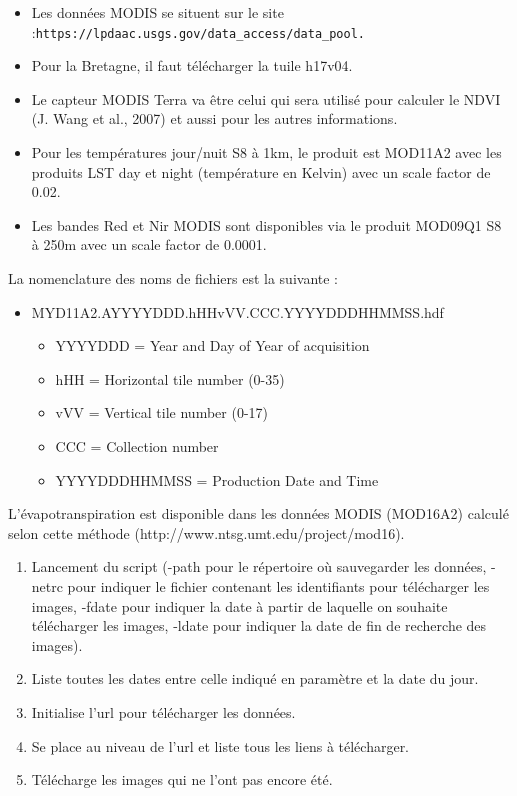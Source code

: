 \documentclass[10pt,a4paper]{article}
\begin{document}
\begin{itemize}
\item Les données MODIS se situent sur le site :\newline \verb!https://lpdaac.usgs.gov/data_access/data_pool.!
\item Pour la Bretagne, il faut télécharger la tuile h17v04. 
\item Le capteur MODIS Terra va être celui qui sera utilisé pour calculer le NDVI (J. Wang et al., 2007) et aussi pour les autres informations.
\item Pour les températures jour/nuit S8 à 1km, le produit est MOD11A2 avec les produits LST day et night (température en Kelvin) avec un scale factor de 0.02.
\item Les bandes Red et Nir MODIS sont disponibles via le produit MOD09Q1 S8 à 250m avec un scale factor de 0.0001.
\end{itemize}  

La nomenclature des noms de fichiers est la suivante :
\begin{itemize}
\item MYD11A2.AYYYYDDD.hHHvVV.CCC.YYYYDDDHHMMSS.hdf
\begin{itemize}
\item YYYYDDD = Year and Day of Year of acquisition
\item hHH = Horizontal tile number (0-35)
\item vVV = Vertical tile number (0-17)
\item CCC = Collection number
\item YYYYDDDHHMMSS = Production Date and Time
\end{itemize}
\end{itemize}

L'évapotranspiration est disponible dans les données MODIS (MOD16A2) calculé selon cette méthode (http://www.ntsg.umt.edu/project/mod16).

\begin{enumerate}
\item Lancement du script (-path pour le répertoire où sauvegarder les données, -netrc pour indiquer le fichier contenant les identifiants pour télécharger les images, -fdate pour indiquer la date à partir de laquelle on souhaite télécharger les images, -ldate pour indiquer la date de fin de recherche des images).
\item Liste toutes les dates entre celle indiqué en paramètre et la date du jour.
\item Initialise l'url pour télécharger les données.
\item Se place au niveau de l'url et liste tous les liens à télécharger.
\item Télécharge les images qui ne l'ont pas encore été.
\end{enumerate}
\end{document}

